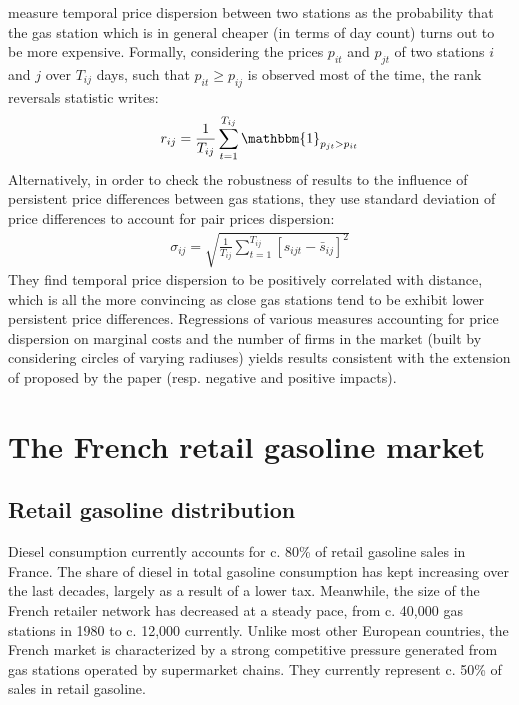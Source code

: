 \documentclass[english]{article}
\begin{document}
\cite{TAP11} measure temporal price dispersion between two stations as the probability that the gas station which is in general cheaper (in terms of day count) turns out to be more expensive. Formally, considering the prices $p_{it}$ and $p_{jt}$ of two stations $i$ and $j$ over $T_{ij}$ days, such that $p_{it} \ge p_{ij}$ is observed most of the time, the rank reversals statistic writes:
\begin{align*}
r_{ij} = \frac{1}{T_{ij}} \sum_{t=1}^{T_{ij}} \mathbbm{1}_{p_{jt} > p_{it}}
\end{align*}
Alternatively, in order to check the robustness of results to the influence of persistent price differences between gas stations, they use standard deviation of price differences to account for pair prices dispersion:
\begin{align*}
\sigma_{ij} = \sqrt{\frac{1}{T_{ij}} \sum_{t=1}^{T_{ij}} [s_{ijt} - \bar{s}_{ij}]^2}
\end{align*}
They find temporal price dispersion to be positively correlated with distance, which is all the more convincing as close gas stations tend to be exhibit lower persistent price differences. Regressions of various measures accounting for price dispersion on marginal costs and the number of firms in the market (built by considering circles of varying radiuses) yields results consistent with the extension of \cite{VAR80} proposed by the paper (resp. negative and positive impacts).

\section{The French retail gasoline market}

\subsection{Retail gasoline distribution}

Diesel consumption currently accounts for c. 80\% of retail gasoline sales in France. The share of diesel in total gasoline consumption has kept increasing over the last decades, largely as a result of a lower tax. Meanwhile, the size of the French retailer network has decreased at a steady pace, from c. 40,000 gas stations in 1980 to c. 12,000 currently.  Unlike most other European countries, the French market is characterized by a strong competitive pressure generated from gas stations operated by supermarket chains. They currently represent c. 50\% of sales in retail gasoline.
\end{document}
